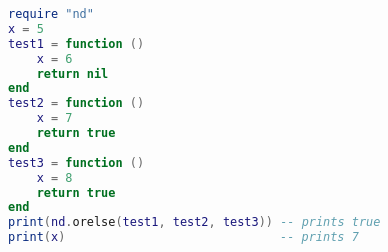 \begin{lstlisting}[language=lua, caption={Using \texttt{nd.orelse}.}, label=lst:orelse, name=lst:orelse]
require "nd"
x = 5
test1 = function ()
	x = 6
	return nil
end
test2 = function ()
	x = 7
	return true
end
test3 = function ()
	x = 8
	return true
end
print(nd.orelse(test1, test2, test3)) -- prints true
print(x)                              -- prints 7
\end{lstlisting}
